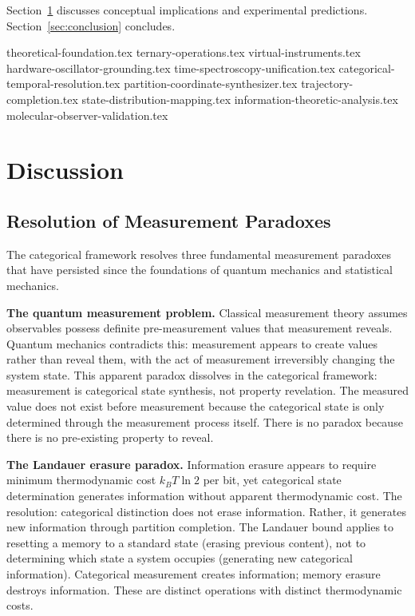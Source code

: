 \documentclass[11pt,a4paper]{article}
\theoremstyle{remark}
\begin{document}
Section~\ref{sec:discussion} discusses conceptual implications and experimental predictions. Section~\ref{sec:conclusion} concludes.

{theoretical-foundation.tex}
{ternary-operations.tex}
{virtual-instruments.tex}
{hardware-oscillator-grounding.tex}
{time-spectroscopy-unification.tex}
{categorical-temporal-resolution.tex}
{partition-coordinate-synthesizer.tex}
{trajectory-completion.tex}
{state-distribution-mapping.tex}
{information-theoretic-analysis.tex}
{molecular-observer-validation.tex}

\section{Discussion}
\label{sec:discussion}

\subsection{Resolution of Measurement Paradoxes}

The categorical framework resolves three fundamental measurement paradoxes that have persisted since the foundations of quantum mechanics and statistical mechanics.

\textbf{The quantum measurement problem.} Classical measurement theory assumes observables possess definite pre-measurement values that measurement reveals. Quantum mechanics contradicts this: measurement appears to create values rather than reveal them, with the act of measurement irreversibly changing the system state. This apparent paradox dissolves in the categorical framework: measurement is categorical state synthesis, not property revelation. The measured value does not exist before measurement because the categorical state is only determined through the measurement process itself. There is no paradox because there is no pre-existing property to reveal.

\textbf{The Landauer erasure paradox.} Information erasure appears to require minimum thermodynamic cost $k_B T \ln 2$ per bit, yet categorical state determination generates information without apparent thermodynamic cost. The resolution: categorical distinction does not erase information. Rather, it generates new information through partition completion. The Landauer bound applies to resetting a memory to a standard state (erasing previous content), not to determining which state a system occupies (generating new categorical information). Categorical measurement creates information; memory erasure destroys information. These are distinct operations with distinct thermodynamic costs.
\end{document}
